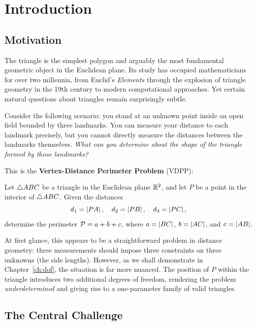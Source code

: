 
\chapter{Introduction}
\label{ch:introduction}

\section{Motivation}

The triangle is the simplest polygon and arguably the most fundamental geometric object in the Euclidean plane. Its study has occupied mathematicians for over two millennia, from Euclid's \emph{Elements} through the explosion of triangle geometry in the 19th century to modern computational approaches. Yet certain natural questions about triangles remain surprisingly subtle.

Consider the following scenario: you stand at an unknown point inside an open field bounded by three landmarks. You can measure your distance to each landmark precisely, but you cannot directly measure the distances between the landmarks themselves. \emph{What can you determine about the shape of the triangle formed by those landmarks?}

This is the \textbf{Vertex-Distance Perimeter Problem} (VDPP):

\begin{problem}
\label{prob:vdpp}
Let $\triangle ABC$ be a triangle in the Euclidean plane $\mathbb{R}^2$, and let $P$ be a point in the interior of $\triangle ABC$. Given the distances
\[
d_1 = \left\lvert PA \right\rvert, \quad d_2 = \left\lvert PB \right\rvert, \quad d_3 = \left\lvert PC \right\rvert,
\]
determine the perimeter $\mathcal{P} = a + b + c$, where $a = \left\lvert BC \right\rvert$, $b = \left\lvert AC \right\rvert$, and $c = \left\lvert AB \right\rvert$.
\end{problem}

At first glance, this appears to be a straightforward problem in distance geometry: three measurements should impose three constraints on three unknowns (the side lengths). However, as we shall demonstrate in Chapter~\ref{ch:dof}, the situation is far more nuanced. The position of $P$ within the triangle introduces two additional degrees of freedom, rendering the problem \emph{underdetermined} and giving rise to a one-parameter family of valid triangles.

\section{The Central Challenge}

